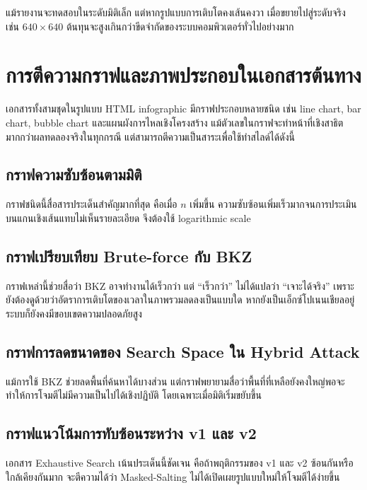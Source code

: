 \documentclass[12pt,a4paper]{article}
\newcommand{\eng}[1]{\textenglish{#1}}
\begin{document}
	แม้รายงานจะทดสอบในระดับมิติเล็ก แต่หากรูปแบบการเติบโตคงเส้นคงวา เมื่อขยายไปสู่ระดับจริง เช่น $640\times640$ ต้นทุนจะสูงเกินกว่าขีดจำกัดของระบบคอมพิวเตอร์ทั่วไปอย่างมาก
	
	\section{การตีความกราฟและภาพประกอบในเอกสารต้นทาง}
	
	เอกสารทั้งสามชุดในรูปแบบ \eng{HTML infographic} มีกราฟประกอบหลายชนิด เช่น \eng{line chart}, \eng{bar chart}, \eng{bubble chart} และแผนผังการไหลเชิงโครงสร้าง แม้ตัวเลขในกราฟจะทำหน้าที่เชิงสาธิตมากกว่าผลทดลองจริงในทุกกรณี แต่สามารถตีความเป็นสาระเพื่อใช้ทำสไลด์ได้ดังนี้
	
	\subsection{กราฟความซับซ้อนตามมิติ}
	
	กราฟชนิดนี้สื่อสารประเด็นสำคัญมากที่สุด คือเมื่อ $n$ เพิ่มขึ้น ความซับซ้อนเพิ่มเร็วมากจนการประเมินบนแกนเชิงเส้นแทบไม่เห็นรายละเอียด จึงต้องใช้ \eng{logarithmic scale}
	
	\subsection{กราฟเปรียบเทียบ \eng{Brute-force} กับ \eng{BKZ}}
	
	กราฟเหล่านี้ช่วยสื่อว่า \eng{BKZ} อาจทำงานได้เร็วกว่า แต่ ``เร็วกว่า'' ไม่ได้แปลว่า ``เจาะได้จริง'' เพราะยังต้องดูด้วยว่าอัตราการเติบโตของเวลาในภาพรวมลดลงเป็นแบบใด หากยังเป็นเอ็กซ์โปเนนเชียลอยู่ ระบบก็ยังคงมีขอบเขตความปลอดภัยสูง
	
	\subsection{กราฟการลดขนาดของ Search Space ใน \eng{Hybrid Attack}}
	
	แม้การใช้ \eng{BKZ} ช่วยลดพื้นที่ค้นหาได้บางส่วน แต่กราฟพยายามสื่อว่าพื้นที่ที่เหลือยังคงใหญ่พอจะทำให้การโจมตีไม่มีความเป็นไปได้เชิงปฏิบัติ โดยเฉพาะเมื่อมิติเริ่มขยับขึ้น
	
	\subsection{กราฟแนวโน้มการทับซ้อนระหว่าง v1 และ v2}
	
	เอกสาร \eng{Exhaustive Search} เน้นประเด็นนี้ชัดเจน คือถ้าพฤติกรรมของ \eng{v1} และ \eng{v2} ซ้อนกันหรือใกล้เคียงกันมาก จะตีความได้ว่า \eng{Masked-Salting} ไม่ได้เปิดเผยรูปแบบใหม่ให้โจมตีได้ง่ายขึ้น
	
\end{document}
